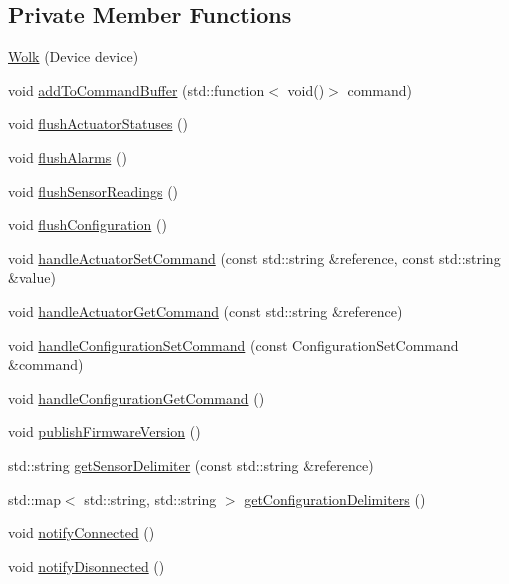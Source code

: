 \subsection*{Private Member Functions}
\begin{DoxyCompactItemize}
\item 
\hyperlink{classwolkabout_1_1_wolk_a41022de71360a1b15a7ea31cd2fb2359}{Wolk} (Device device)
\item 
void \hyperlink{classwolkabout_1_1_wolk_ae35585894387377feeb3a2733a9f97f2}{add\+To\+Command\+Buffer} (std\+::function$<$ void()$>$ command)
\item 
void \hyperlink{classwolkabout_1_1_wolk_a19a43047e89446b79eda7e9c698fea23}{flush\+Actuator\+Statuses} ()
\item 
void \hyperlink{classwolkabout_1_1_wolk_a1ec153b5a83bcd5ee6c0940963f8d104}{flush\+Alarms} ()
\item 
void \hyperlink{classwolkabout_1_1_wolk_af8d94d21e60b2a9d68e7274d98194069}{flush\+Sensor\+Readings} ()
\item 
void \hyperlink{classwolkabout_1_1_wolk_aadf1fc338b0c6f3e28b9c7285abce99b}{flush\+Configuration} ()
\item 
void \hyperlink{classwolkabout_1_1_wolk_aa56ee9c2d0ce80c90ed9e15d5304947b}{handle\+Actuator\+Set\+Command} (const std\+::string \&reference, const std\+::string \&value)
\item 
void \hyperlink{classwolkabout_1_1_wolk_a660c9c9ce35be66b1cedfb4a1e852858}{handle\+Actuator\+Get\+Command} (const std\+::string \&reference)
\item 
void \hyperlink{classwolkabout_1_1_wolk_ad2f16682dda7d5fe9ad86d9fadf51cd2}{handle\+Configuration\+Set\+Command} (const Configuration\+Set\+Command \&command)
\item 
void \hyperlink{classwolkabout_1_1_wolk_a1b64a9d38d23032da4e902ee8aa02bf5}{handle\+Configuration\+Get\+Command} ()
\item 
void \hyperlink{classwolkabout_1_1_wolk_a7e210f7d659cc5d390396710ef128e89}{publish\+Firmware\+Version} ()
\item 
std\+::string \hyperlink{classwolkabout_1_1_wolk_a71be75b9c18efa4912aaede25c9f1f4f}{get\+Sensor\+Delimiter} (const std\+::string \&reference)
\item 
std\+::map$<$ std\+::string, std\+::string $>$ \hyperlink{classwolkabout_1_1_wolk_a700e5f1f34057233c90da1c0380c7e3f}{get\+Configuration\+Delimiters} ()
\item 
void \hyperlink{classwolkabout_1_1_wolk_ae1876fe71977816804ce4ec857e95b31}{notify\+Connected} ()
\item 
void \hyperlink{classwolkabout_1_1_wolk_a86338fabbcc8a75991ce77786b23e118}{notify\+Disonnected} ()
\end{DoxyCompactItemize}
